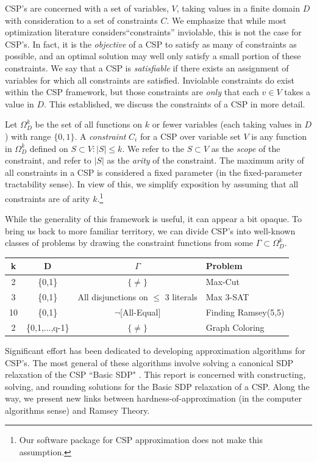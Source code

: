 \documentclass[12pt]{article} %
\begin{document}
CSP's are concerned with a set of variables, $V$, taking values in a finite domain $D$ with consideration to a set of constraints $C$. We emphasize that while most optimization literature considers``constraints'' inviolable, this is not the case for CSP's. In fact, it is the \textit{objective} of a CSP to satisfy as many of constraints as possible, and an optimal solution may well only satisfy a small portion of these constraints. We say that a CSP is \textit{satisfiable} if there exists an assignment of variables for which all constraints are satisfied. Inviolable constraints do exist within the CSP framework, but those constraints are \textit{only} that each $v \in V$ takes a value in $D$. This established, we discuss the constraints of a CSP in more detail. 

Let $\Omega_D^k$ be the set of all functions on $k$ or fewer variables (each taking values in $D$) with range $\{ 0,1 \}$. A \textit{constraint} $C_i$ for a CSP over variable set $V$ is any function in $\Omega_D^k$ defined on $S \subset V : |S| \leq k$. We refer to the $S \subset V$ as the \textit{scope} of the constraint, and refer to $|S|$ as the \textit{arity} of the constraint. The maximum arity of all constraints in a CSP is considered a fixed parameter (in the fixed-parameter tractability sense). In view of this, we simplify exposition by assuming that all constraints are of arity $k$.\footnote{Our software package for CSP approximation does not make this assumption.}

While the generality of this framework is useful, it can appear a bit opaque. To bring us back to more familiar territory, we can divide CSP's into well-known classes of problems by drawing the constraint functions from some $\Gamma \subset \Omega_D^k$.

\begin{center}
\begin{tabular}{c c c l}
\hline
k & D & $\Gamma$ & Problem \\
\hline
2  & \{0,1\} & $\{\neq\}$ & Max-Cut \\
3  & \{0,1\} & All disjunctions on $\leq $ 3 literals & Max 3-SAT \\
10 & \{0,1\} & $\neg$[All-Equal] & Finding Ramsey(5,5) \\
2  & \{0,1,...,q-1\} & $\{\neq\}$ & Graph Coloring \\
\hline
\end{tabular}
\end{center}

Significant effort has been dedicated to developing approximation algorithms for CSP's. The most general of these algorithms involve solving a canonical SDP relaxation of the CSP ``Basic SDP" \cite{raghavendra2008optimal}. This report is concerned with constructing, solving, and rounding solutions for the Basic SDP relaxation of a CSP. Along the way, we present new links between hardness-of-approximation (in the computer algorithms sense) and Ramsey Theory.
\end{document}
